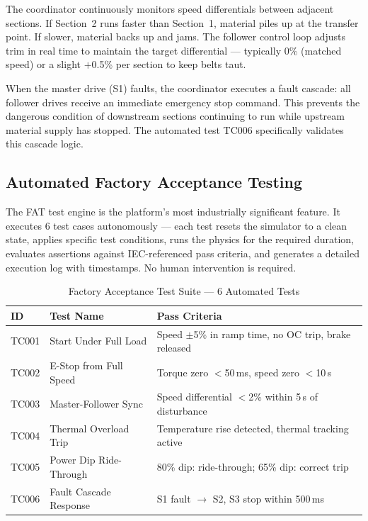 \documentclass[9pt,a4paper,twocolumn,twoside]{tau-class/tau}
\begin{document}
The coordinator continuously monitors speed differentials between adjacent sections. If Section~2 runs faster than Section~1, material piles up at the transfer point. If slower, material backs up and jams. The follower control loop adjusts trim in real time to maintain the target differential — typically 0\% (matched speed) or a slight $+$0.5\% per section to keep belts taut.

When the master drive (S1) faults, the coordinator executes a fault cascade: all follower drives receive an immediate emergency stop command. This prevents the dangerous condition of downstream sections continuing to run while upstream material supply has stopped. The automated test TC006 specifically validates this cascade logic.

\subsection{Automated Factory Acceptance Testing}

The FAT test engine is the platform's most industrially significant feature. It executes 6 test cases autonomously — each test resets the simulator to a clean state, applies specific test conditions, runs the physics for the required duration, evaluates assertions against IEC-referenced pass criteria, and generates a detailed execution log with timestamps. No human intervention is required.

\begin{table}[H]
    \caption{Factory Acceptance Test Suite — 6 Automated Tests}
    \label{tab:fat}
    \begin{tabular}{@{}p{} p{} p{}@{}}
    \toprule
    \textbf{ID} & \textbf{Test Name} & \textbf{Pass Criteria} \\
    \midrule
    TC001 & Start Under Full Load & Speed $\pm$5\% in ramp time, no OC trip, brake released \\
    TC002 & E-Stop from Full Speed & Torque zero $<$50\,ms, speed zero $<$10\,s \\
    TC003 & Master-Follower Sync & Speed differential $<$2\% within 5\,s of disturbance \\
    TC004 & Thermal Overload Trip & Temperature rise detected, thermal tracking active \\
    TC005 & Power Dip Ride-Through & 80\% dip: ride-through; 65\% dip: correct trip \\
    TC006 & Fault Cascade Response & S1 fault $\rightarrow$ S2, S3 stop within 500\,ms \\
    \bottomrule
    \end{tabular}
\end{table}
\end{document}
